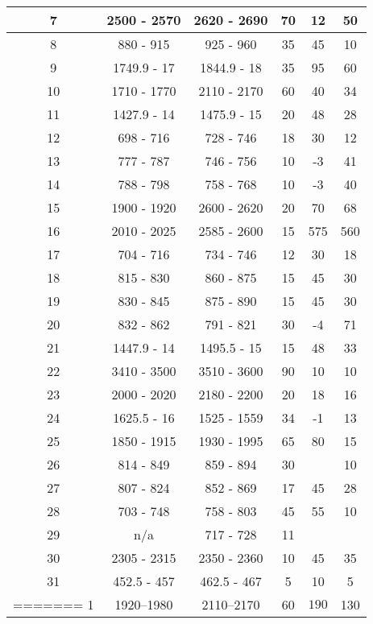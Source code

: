 \begin{table}[]
\begin{tabular}{|c|c|c|c|c|c|}
    7  & 2500 - 2570 & 2620 - 2690 & 70 & 12  & 50  \\ \hline
    8  & 880 - 915   & 925 - 960   & 35 & 45  & 10  \\ \hline
    9  & 1749.9 - 17 & 1844.9 - 18 & 35 & 95  & 60  \\ \hline
    10 & 1710 - 1770 & 2110 - 2170 & 60 & 40  & 34  \\ \hline
    11 & 1427.9 - 14 & 1475.9 - 15 & 20 & 48  & 28  \\ \hline
    12 & 698 - 716   & 728 - 746   & 18 & 30  & 12  \\ \hline
    13 & 777 - 787   & 746 - 756   & 10 & -3  & 41  \\ \hline
    14 & 788 - 798   & 758 - 768   & 10 & -3  & 40  \\ \hline
    15 & 1900 - 1920 & 2600 - 2620 & 20 & 70  & 68  \\ \hline
    16 & 2010 - 2025 & 2585 - 2600 & 15 & 575 & 560 \\ \hline
    17 & 704 - 716   & 734 - 746   & 12 & 30  & 18  \\ \hline
    18 & 815 - 830   & 860 - 875   & 15 & 45  & 30  \\ \hline
    19 & 830 - 845   & 875 - 890   & 15 & 45  & 30  \\ \hline
    20 & 832 - 862   & 791 - 821   & 30 & -4  & 71  \\ \hline
    21 & 1447.9 - 14 & 1495.5 - 15 & 15 & 48  & 33  \\ \hline
    22 & 3410 - 3500 & 3510 - 3600 & 90 & 10  & 10  \\ \hline
    23 & 2000 - 2020 & 2180 - 2200 & 20 & 18  & 16  \\ \hline
    24 & 1625.5 - 16 & 1525 - 1559 & 34 & -1  & 13  \\ \hline
    25 & 1850 - 1915 & 1930 - 1995 & 65 & 80  & 15  \\ \hline
    26 & 814 - 849   & 859 - 894   & 30 &     & 10  \\ \hline
    27 & 807 - 824   & 852 - 869   & 17 & 45  & 28  \\ \hline
    28 & 703 - 748   & 758 - 803   & 45 & 55  & 10  \\ \hline
    29 & n/a         & 717 - 728   & 11 &     &     \\ \hline
    30 & 2305 - 2315 & 2350 - 2360 & 10 & 45  & 35  \\ \hline
    31 & 452.5 - 457 & 462.5 - 467 & 5  & 10  & 5   \\ \hline
=======
    1  & 1920--1980 & 2110--2170 & 60 & $190$ & 130 \\ \hline

\end{tabular}
\end{table}
